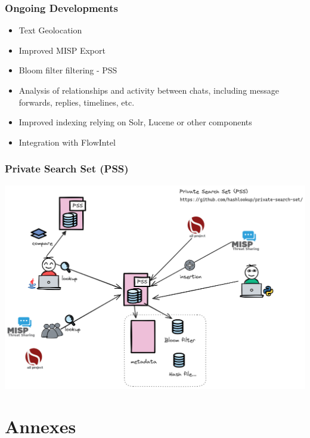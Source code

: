 \documentclass[aspectratio=169]{beamer}
\begin{document}
\begin{frame}
    \frametitle{Ongoing Developments}
        \begin{itemize}
            \item Text Geolocation
            \item Improved MISP Export
            \item Bloom filter filtering - PSS
            \item Analysis of relationships and activity between chats, including message forwards, replies, timelines, etc.
            \item Improved indexing relying on Solr, Lucene or other components
            \item Integration with FlowIntel
        \end{itemize}
\end{frame}


\begin{frame}
    \frametitle{Private Search Set (PSS)}
    \begin{center}
        \includegraphics[scale=0.27]{images/pss-overview.png}
    \end{center}
\end{frame}


\section{Annexes}


\end{document}
